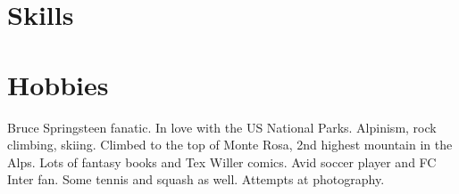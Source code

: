 \documentclass[a4paper]{moderncv}
\begin{document}

%
%
%
%
%
%
%
%

\section{Skills}


\section{Hobbies}
Bruce Springsteen fanatic. In love with the US National Parks.
Alpinism, rock climbing, skiing.  Climbed to the top of Monte Rosa, 2nd highest mountain in the Alps. Lots of fantasy books and Tex Willer comics.  Avid soccer player and FC Inter fan. Some tennis and squash as well. 
 Attempts at photography.%
\end{document}
